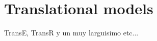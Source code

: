 

\section{Translational models}\label{sec:emb-translations}

TransE, TransR y un muy larguisimo etc...




